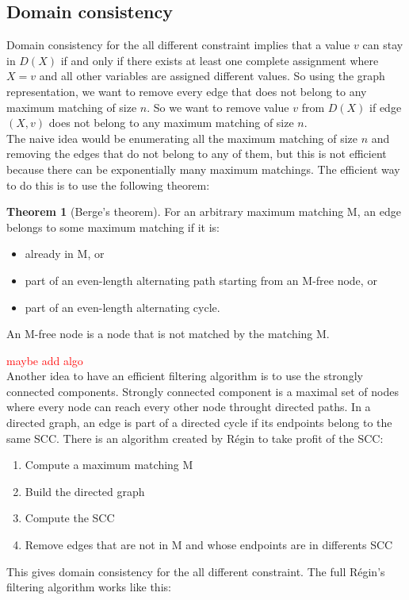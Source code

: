 \documentclass[12pt, openany]{report}
\theoremstyle{definition}
\newtheorem{thm}{Theorem}[chapter]
\begin{document}
\subsection{Domain consistency}
Domain consistency for the all different constraint implies that a value $v$ can stay in $D(X)$ if and only if there exists at least one complete assignment where $X = v$ and all other variables are assigned different values. So using the graph representation, we want to remove every edge that does not belong to any maximum matching of size $n$. So we want to remove value $v$ from $D(X)$ if edge $(X,v)$ does not belong to any maximum matching of size $n$.\\
The naive idea would be enumerating all the maximum matching of size $n$ and removing the edges that do not belong to any of them, but this is not efficient because there can be exponentially many maximum matchings. The efficient way to do this is to use the following theorem: 
\begin{thm}[Berge’s theorem]
    For an arbitrary maximum matching M, an edge belongs to some maximum matching if it is:
    \begin{itemize}
        \item already in M, or
        \item  part of an even-length alternating path starting from an M-free node, or
        \item part of an even-length alternating cycle.
    \end{itemize}
    An M-free node is a node that is not matched by the matching M.
\end{thm}
\textcolor{red}{maybe add algo}\\
Another idea to have an efficient filtering algorithm is to use the strongly connected components. Strongly connected component is a maximal set of nodes where every node can reach every other node throught directed paths. In a directed graph, an edge is part of a directed cycle if its endpoints belong to the same SCC. There is an algorithm created by Régin to take profit of the SCC:
\begin{enumerate}
    \item Compute a maximum matching M
    \item Build the directed graph
    \item Compute the SCC
    \item Remove edges that are not in M and whose endpoints are in differents SCC
\end{enumerate}
This gives domain consistency for the all different constraint. The full Régin's filtering algorithm works like this:
\end{document}
